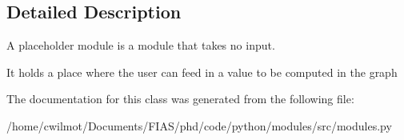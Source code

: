 \subsection{Detailed Description}
A placeholder module is a module that takes no input. 

It holds a place where the user can feed in a value to be computed in the graph 

The documentation for this class was generated from the following file\+:\begin{DoxyCompactItemize}
\item 
/home/cwilmot/\+Documents/\+F\+I\+A\+S/phd/code/python/modules/src/modules.\+py\end{DoxyCompactItemize}

